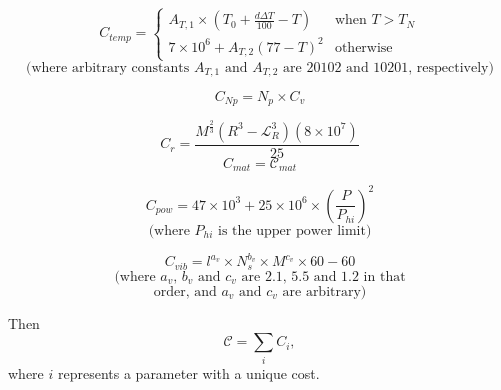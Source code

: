 \documentclass{article}
\begin{document}
    \[C_{temp} = \begin{cases}
                 A_{T, 1}\times\left(T_0 + \frac{d\Delta T}{100} - T\right) & \text{when $T > T_N$} \\
                 7 \times 10^6 + A_{T, 2}\left(77 - T\right)^2 & \text{otherwise}
                 \end{cases}
    \]
    \[
    \text{(where arbitrary constants $A_{T, 1}$ and $A_{T, 2}$ are 20102 and 10201, respectively)}
    \]
 \begin{multicols}{2}   
    \[C_{Np} = N_p \times C_v
    \]

        \[C_{r} =\frac{M^{\frac{2}{3}}(R^3 - \mathcal{L}_R^3)(8 \times 10^7)}{25}
    \]
    \break
    \[C_{mat} = \mathcal{C}_{mat}
    \]

    \[C_{pow} = 47 \times 10^3 + 25 \times 10 ^ 6 \times \left(\frac{P}{P_{hi}}\right)^2 
    \]
    \[
    \text{(where $P_{hi}$ is the upper power limit)}
    \]

    \[C_{vib} = l^{a_v} \times N_s^{b_v} \times M^{c_v} \times 60 - 60
    \]
    \[
    \text{(where $a_v$, $b_v$ and $c_v$ are 2.1, 5.5 and 1.2 in that}
    \]
    \[
    \text{order, and $a_v$ and $c_v$ are arbitrary)}
    \]
 \end{multicols}   

Then
\[
\mathcal{C} = \sum_{i} C_i,
\]
where $i$ represents a parameter with a unique cost.
\end{document}
